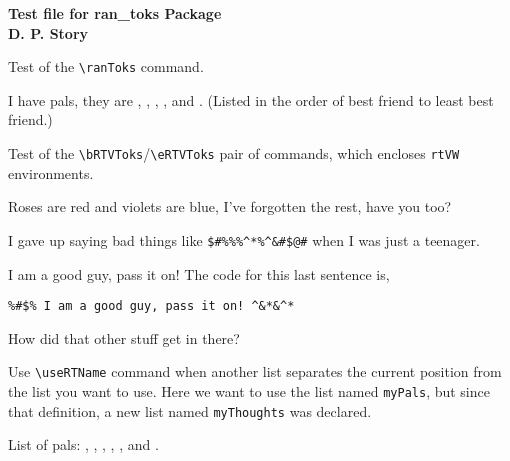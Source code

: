 \documentclass{article}
\begin{document}
\begin{center}\bfseries
    Test file for \textsf{ran\_toks} Package\\[3pt]
        D. P. Story
\end{center}

Test of the \verb!\ranToks! command.

I have {} pals, they are , ,
, , {} and . (Listed
in the order of best friend to least best friend.)

Test of the \verb!\bRTVToks!/\verb!\eRTVToks! pair of commands, which encloses
\texttt{rtVW} environments.

%
\begin{rtVW}
\begin{minipage}[t]{.67\linewidth}
Roses are red and violets are blue,
I've forgotten the rest, have you too?
\end{minipage}
\end{rtVW}
\begin{rtVW}
\begin{minipage}[t]{.67\linewidth}
I gave up saying bad things like
\verb!$#%%%^*%^&#$@#! when I was just a teenager.
\end{minipage}
\end{rtVW}
\begin{rtVW}
\begin{minipage}[t]{.67\linewidth}
I am a good guy, pass it on! The code for this last sentence is,
\begin{verbatim}
%#$% I am a good guy, pass it on! ^&*&^*
\end{verbatim}
How did that other stuff get in there?
\end{minipage}
\end{rtVW}
\eRTVToks
\begin{enumerate}
\end{enumerate}
Use \verb!\useRTName! command when another list separates the current
position from the list you want to use. Here we want to use the list named
\texttt{myPals}, but since that definition, a new list named
\texttt{myThoughts} was declared.

List of pals: , , ,
, , and .
\end{document}
